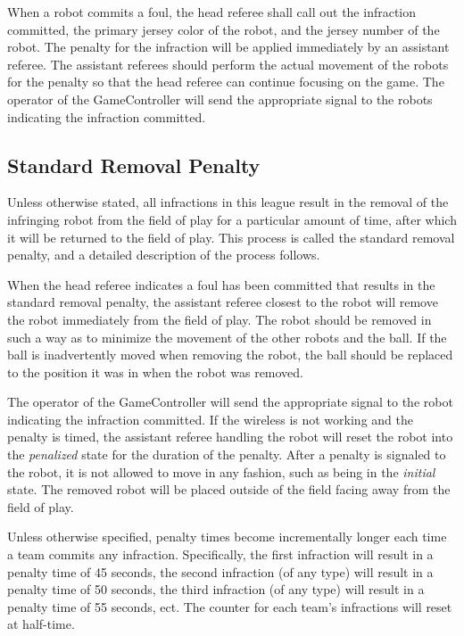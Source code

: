 \documentclass[12pt]{article}
\begin{document}
When a robot commits a foul, the head referee shall call out the infraction committed, the primary jersey color of the robot, and the jersey number of the robot. The penalty for the infraction will be applied immediately by an assistant referee. The assistant referees should perform the actual movement of the robots for the penalty so that the head referee can continue focusing on the game. The operator of the GameController will send the appropriate signal to the robots indicating the infraction committed.

\subsection{Standard Removal Penalty}
\label{sec:removal_penalty}

Unless otherwise stated, all infractions in this league result in the removal of the infringing robot from the field of play for a particular amount of time, after which it will be returned to the field of play. This process is called the standard removal penalty, and a detailed description of the process follows.

When the head referee indicates a foul has been committed that results in the standard removal penalty, the assistant referee closest to the robot will remove the robot immediately from the field of play. The robot should be removed in such a way as to minimize the movement of the other robots and the ball. If the ball is inadvertently moved when removing the robot, the ball should be replaced to the position it was in when the robot was removed.

The operator of the GameController will send the appropriate signal to the robot indicating the infraction committed. If the wireless is not working and the penalty is timed, the assistant referee handling the robot will reset the robot into the \emph{penalized} state for the duration of the penalty. After a penalty is signaled to the robot, it is not allowed to move in any fashion, such as being in the \emph{initial} state. The removed robot will be placed outside of the field facing away from the field of play.

Unless otherwise specified, penalty times become incrementally longer each time a team commits any infraction.  Specifically, the first infraction will result in a penalty time of 45 seconds, the second infraction (of any type) will result in a penalty time of 50 seconds, the third infraction (of any type) will result in a penalty time of 55 seconds, ect.  The counter for each team's infractions will reset at half-time.  
\end{document}
